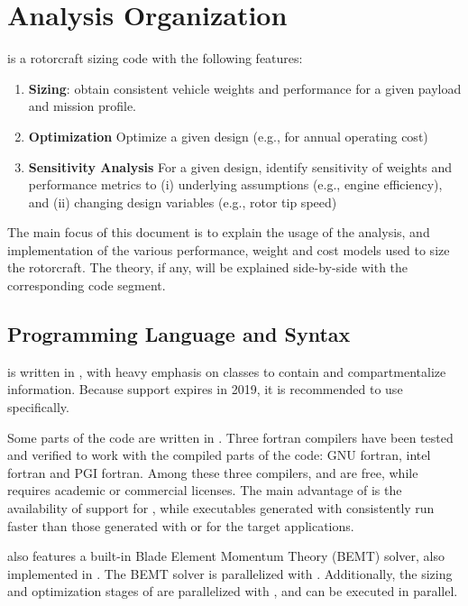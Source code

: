 \section{\textbf{Analysis Organization}}

\hydra \spc is a rotorcraft sizing code with the following features:
\begin{enumerate}
\item \textbf{Sizing}: obtain consistent vehicle weights and performance for a given payload and mission profile.
\item \textbf{Optimization} Optimize a given design (e.g., for annual operating cost) 
\item \textbf{Sensitivity Analysis} For a given design, identify sensitivity of weights and performance metrics to (i) underlying assumptions (e.g., engine efficiency), and (ii) changing design variables (e.g., rotor tip speed)
\end{enumerate}

The main focus of this document is to explain the usage of the analysis, and implementation of the various performance, weight and cost models used to size the rotorcraft. The theory, if any, will be explained side-by-side with the corresponding code segment. 

\subsection{\textbf{Programming Language and Syntax}}
\hydra \spc is written in , with heavy emphasis on classes to contain and compartmentalize information. Because  support expires in 2019, it is recommended to use  specifically.

Some parts of the code are written in . Three fortran compilers have been tested and verified to work with the compiled parts of the code: GNU fortran, intel fortran and PGI fortran. Among these three compilers,  and  are free, while  requires academic or commercial licenses. The main advantage of  is the availability of support for , while executables generated with  consistently run faster than those generated with  or  for the target applications. 

\hydra \spc also features a built-in Blade Element Momentum Theory (BEMT) solver, also implemented in . The BEMT solver is parallelized with . Additionally, the sizing and optimization stages of \hydra \spc are parallelized with , and can be executed in parallel.

